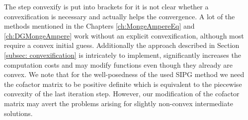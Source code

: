 The step convexify is put into brackets for it is not clear whether a convexification is necessary and actually helps the convergence. A lot of the methods mentioned in the Chapters \ref{ch:MongeAmpereEq} and \ref{ch:DGMongeAmpere} work without an explicit convexification, although most require a convex initial guess. 
Additionally the approach described in Section \ref{subsec: convexification} is intricately to implement, significantly increases the computation costs and may modify functions even though they already are convex. We note that for the well-posedness of the used SIPG method we need the cofactor matrix to be positive definite which is equivalent to the piecewise convexity of the last iteration step. However, our modification of the cofactor matrix  may avert the problems arising for slightly non-convex intermediate solutions.
